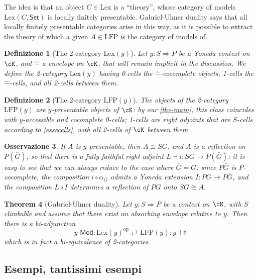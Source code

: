 \documentclass[11pt]{article}
\def\Set{\mathsf{Set}}
\def\To{\Rightarrow}
\def\opp{\mathrm{op}}
\theoremstyle{reference}
\newtheorem{theorem}{Theorem}[section]
\newtheorem{definition}[theorem]{Definizione}
\newtheorem{remark}[theorem]{Osservazione}
\begin{document}
\begin{prop}
The idea is that an object \(C\in\text{Lex}\) is a ``theory'', whose category of models \(\text{Lex}(C,\Set)\) is locally finitely presentable. Gabriel\hyp{}Ulmer duality says that all locally finitely presentable categories arise in this way, as it is possible to extract the theory of which a given \(A\in\text{LFP}\) is the category of models of.
\begin{definition}[The 2-category $\text{Lex}(y)$]
	Let $y : S\To P$ be a Yoneda context on $\cK$, and $\widehat{ - }$ a \gu envelope on $\cK$, that will remain implicit in the discussion. We define the 2-category $\text{Lex}(y)$ having 0-cells the $\widehat{ - }$-cocomplete objects, 1-cells the $\widehat{ - }$-cells, and all 2-cells between them.
\end{definition}
\begin{definition}[The 2-category $\text{LFP}({y})$]
	The objects of the 2-category $\text{LFP}({y})$ are $y$-presentable objects of $\cK$: by our \autoref{the-main}, this class coincides with $y$-accessible and cocomplete 0-cells; 1-cells are right adjoints that are $S$-cells according to \autoref{essecells}, with all 2-cells of $\cK$ between them.
\end{definition}
\begin{remark}
	If $A$ is $y$-presentable, then $A\cong S G$, and $A$ is a reflection on $P (\bar G)$, so that there is a fully faithful right adjoint $L\dashv i : S G\to P(\bar G)$; it is easy to see that we can always reduce to the case where $\bar G = G$: since $P\bar G$ is $P$-cocomplete, the composition $i \circ \alpha_G$ admits a Yoneda extension $I : P G\to P \bar G$, and the composition $L \circ I$ determines a reflection of $P G$ onto $S G \cong A$.
\end{remark}
\begin{theorem}[Gabriel\hyp{}Ulmer duality]\label{guduality}
	Let $y : S\To P$ be a context on $\cK$, with $S$ climbable and assume that there exist an absorbing \gu envelope relative to $y$. Then there is a bi-adjunction
	\[
		y\textsf{-Mod} : \text{Lex}(y)^\opp \rightleftarrows \text{LFP}(y) : y\textsf{-Th}
	\]
	which is in fact a bi-equivalence of 2-categories.
\end{theorem}

\subsection{Esempi, tantissimi esempi}
\label{sec:org1ff6226}

\subsubsection{}
\label{sec:orgccf2ea6}

\end{prop}
\end{document}
